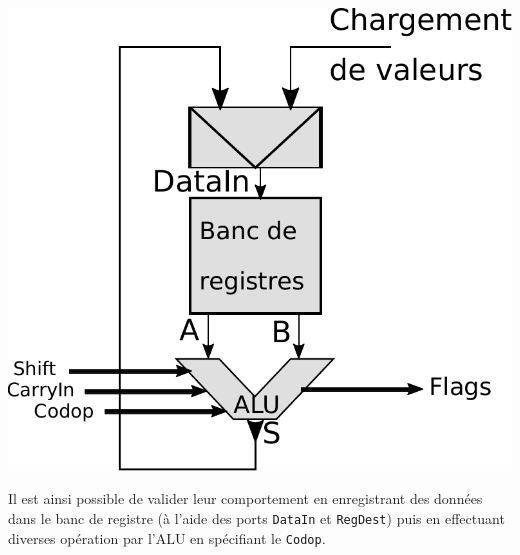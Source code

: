 \documentclass{article}
\begin{document}
    \hspace{14em}\includegraphics[scale=0.5]{pictures/ALU_Registers.pdf}

    Il est ainsi possible de valider leur comportement en enregistrant des données dans le banc de registre (à l'aide des ports \texttt{DataIn} et \texttt{RegDest})
    puis en effectuant diverses opération par l'ALU en spécifiant le \texttt{Codop}.
\end{document}
